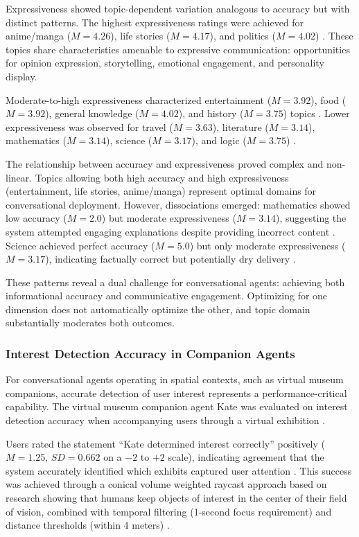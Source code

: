 \documentclass[manuscript,anonymous,sigconf]{acmart}
\begin{document}
Expressiveness showed topic-dependent variation analogous to accuracy but with distinct patterns. The highest expressiveness ratings were achieved for anime/manga ($M = 4.26$), life stories ($M = 4.17$), and politics ($M = 4.02$) \cite{A81}. These topics share characteristics amenable to expressive communication: opportunities for opinion expression, storytelling, emotional engagement, and personality display.

Moderate-to-high expressiveness characterized entertainment ($M = 3.92$), food ($M = 3.92$), general knowledge ($M = 4.02$), and history ($M = 3.75$) topics \cite{A81}. Lower expressiveness was observed for travel ($M = 3.63$), literature ($M = 3.14$), mathematics ($M = 3.14$), science ($M = 3.17$), and logic ($M = 3.75$) \cite{A81}.

The relationship between accuracy and expressiveness proved complex and non-linear. Topics allowing both high accuracy and high expressiveness (entertainment, life stories, anime/manga) represent optimal domains for conversational deployment. However, dissociations emerged: mathematics showed low accuracy ($M = 2.0$) but moderate expressiveness ($M = 3.14$), suggesting the system attempted engaging explanations despite providing incorrect content \cite{A81}. Science achieved perfect accuracy ($M = 5.0$) but only moderate expressiveness ($M = 3.17$), indicating factually correct but potentially dry delivery \cite{A81}.

These patterns reveal a dual challenge for conversational agents: achieving both informational accuracy and communicative engagement. Optimizing for one dimension does not automatically optimize the other, and topic domain substantially moderates both outcomes.

\subsubsection{Interest Detection Accuracy in Companion Agents}

For conversational agents operating in spatial contexts, such as virtual museum companions, accurate detection of user interest represents a performance-critical capability. The virtual museum companion agent Kate was evaluated on interest detection accuracy when accompanying users through a virtual exhibition \cite{A82}.

Users rated the statement ``Kate determined interest correctly'' positively ($M = 1.25$, $SD = 0.662$ on a $-2$ to $+2$ scale), indicating agreement that the system accurately identified which exhibits captured user attention \cite{A82}. This success was achieved through a conical volume weighted raycast approach based on research showing that humans keep objects of interest in the center of their field of vision, combined with temporal filtering (1-second focus requirement) and distance thresholds (within 4 meters) \cite{A82}.
\end{document}
